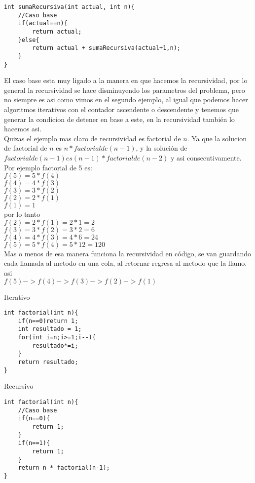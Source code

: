 \begin{minipage}{\textwidth}
\begin{lstlisting}[style=C,caption=sumaRecursiva2.cpp]
int sumaRecursiva(int actual, int n){
    //Caso base
    if(actual==n){
        return actual;
    }else{
        return actual + sumaRecursiva(actual+1,n);
    }
}
\end{lstlisting}
\end{minipage}
El caso base esta muy ligado a la manera en que hacemos la recursividad, por lo general la 
recursividad se hace disminuyendo los parametros del problema, pero no siempre es asi como 
vimos en el segundo ejemplo, al igual que podemos hacer algoritmos iterativos con el contador
ascendente o descendente y tenemos que generar la condicion de detener en base a este, en la
recursividad también lo hacemos asi.
\\Quizas el ejemplo mas claro de recursividad es factorial de $n$. Ya que la solucion de factorial
de $n$ es $n * factorial de (n-1)$, y la solución de $factorial de (n-1) es (n-1) * factorial de (n-2)$ y asi consecutivamente. Por ejemplo factorial de 5 es:
\\$f(5) = 5*f(4)$
\\$f(4) = 4*f(3)$
\\$f(3) = 3*f(2)$
\\$f(2) = 2*f(1)$
\\$f(1) = 1$
\\por lo tanto
\\$f(2) = 2*f(1) = 2*1 = 2$
\\$f(3) = 3*f(2) = 3*2 = 6$
\\$f(4) = 4*f(3) = 4*6 = 24$
\\$f(5) = 5*f(4) = 5*12 = 120$
\\Mas o menos de esa manera funciona la recursividad en código, se van guardando cada llamada al 
metodo en una cola, al retornar regresa al metodo que la llamo. asi 
\\$f(5)->f(4)->f(3)->f(2)->f(1)$
\\\begin{minipage}{\textwidth}
Iterativo
\begin{lstlisting}[style=C,caption=factorialIterativo.cpp]
int factorial(int n){
    if(n==0)return 1;
    int resultado = 1;
    for(int i=n;i>=1;i--){
        resultado*=i;
    }
    return resultado;
}
\end{lstlisting}
\end{minipage}

\begin{minipage}{\textwidth}
Recursivo
\begin{lstlisting}[style=C,caption=factorialRecursivo.cpp]
int factorial(int n){
    //Caso base
    if(n==0){
        return 1;
    }
    if(n==1){
        return 1;
    }
    return n * factorial(n-1);
}
\end{lstlisting}
\end{minipage}

